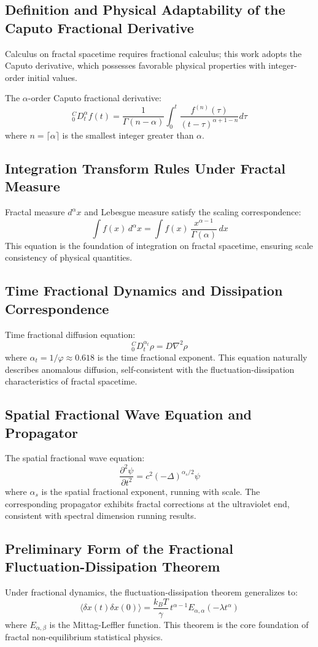 \documentclass[12pt,a4paper,twocolumn]{article}
\renewcommand{\phi}{\varphi}
\begin{document}
\subsection{Definition and Physical Adaptability of the Caputo Fractional Derivative}
Calculus on fractal spacetime requires fractional calculus; this work adopts the Caputo derivative, which possesses favorable physical properties with integer-order initial values.

The $\alpha$-order Caputo fractional derivative:
\[
{}_{0}^{C}D_t^\alpha f(t) = \frac{1}{\Gamma(n-\alpha)} \int_0^t \frac{f^{(n)}(\tau)}{(t-\tau)^{\alpha+1-n}} d\tau
\]
where $n = \lceil \alpha \rceil$ is the smallest integer greater than $\alpha$.

\subsection{Integration Transform Rules Under Fractal Measure}
Fractal measure $d^\alpha x$ and Lebesgue measure satisfy the scaling correspondence:
\[
\int f(x)\,d^\alpha x = \int f(x)\, \frac{x^{\alpha-1}}{\Gamma(\alpha)}\,dx
\]
This equation is the foundation of integration on fractal spacetime, ensuring scale consistency of physical quantities.

\subsection{Time Fractional Dynamics and Dissipation Correspondence}
Time fractional diffusion equation:
\[
{}_{0}^{C}D_t^{\alpha_t} \rho = D \nabla^2 \rho
\]
where $\alpha_t = 1/\phi \approx 0.618$ is the time fractional exponent. This equation naturally describes anomalous diffusion, self-consistent with the fluctuation-dissipation characteristics of fractal spacetime.

\subsection{Spatial Fractional Wave Equation and Propagator}
The spatial fractional wave equation:
\[
\frac{\partial^2 \psi}{\partial t^2} = c^2 (-\Delta)^{\alpha_s/2} \psi
\]
where $\alpha_s$ is the spatial fractional exponent, running with scale. The corresponding propagator exhibits fractal corrections at the ultraviolet end, consistent with spectral dimension running results.

\subsection{Preliminary Form of the Fractional Fluctuation-Dissipation Theorem}
Under fractional dynamics, the fluctuation-dissipation theorem generalizes to:
\[
\langle \delta x(t) \delta x(0) \rangle = \frac{k_B T}{\gamma} \, t^{\alpha-1} E_{\alpha,\alpha}(-\lambda t^\alpha)
\]
where $E_{\alpha,\beta}$ is the Mittag-Leffler function. This theorem is the core foundation of fractal non-equilibrium statistical physics.
\end{document}

